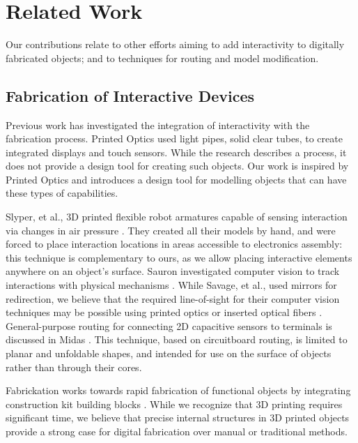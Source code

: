 \section{Related Work}
Our contributions relate to other efforts aiming to add interactivity to digitally fabricated objects; and to techniques for routing and model modification.  

\subsection{Fabrication of Interactive Devices}

Previous work has investigated the integration of interactivity with the fabrication process.  Printed Optics \cite{Willis-printedoptics} used light pipes, solid clear tubes, to create integrated displays and touch sensors. While the research describes a process, it does not provide a design tool for creating such objects. Our work is inspired by Printed Optics and introduces a design tool for modelling objects that can have these types of capabilities.  

Slyper, et al., 3D printed flexible robot armatures capable of sensing interaction via changes in air pressure \cite{Slyper-pressure}.  They created all their models by hand, and were forced to place interaction locations in areas accessible to electronics assembly: this technique is complementary to ours, as we allow placing interactive elements anywhere on an object's surface. Sauron investigated computer vision to track interactions with physical mechanisms \cite{Savage-sauron}.  While Savage, et al., used mirrors for redirection, we believe that the required line-of-sight for their computer vision techniques may be possible using printed optics or inserted optical fibers .  General-purpose routing for connecting 2D capacitive sensors to terminals is discussed in Midas \cite{Savage-midas}.  This technique, based on circuitboard routing, is limited to planar and unfoldable shapes, and intended for use on the surface of objects rather than through their cores.

Fabrickation works towards rapid fabrication of functional objects by integrating construction kit building blocks \cite{Mueller-fabrickation}.  While we recognize that 3D printing requires significant time, we believe that precise internal structures in 3D printed objects provide a strong case for digital fabrication over manual or traditional methods.

